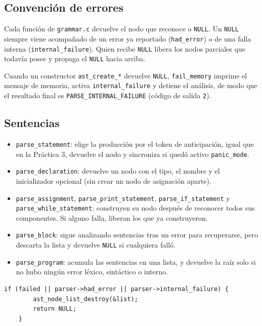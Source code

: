 \documentclass[12pt,letterpaper]{article}
\begin{document}
\subsection*{Convención de errores}

Cada función de \texttt{grammar.c} devuelve el nodo que reconoce o \texttt{NULL}. Un \texttt{NULL} siempre
viene acompañado de un error ya reportado (\texttt{had\_error}) o de una falla interna
(\texttt{internal\_failure}). Quien recibe \texttt{NULL} libera los nodos parciales que todavía posee y
propaga el \texttt{NULL} hacia arriba.

Cuando un constructor \texttt{ast\_create\_*} devuelve \texttt{NULL}, \texttt{fail\_memory} imprime el
mensaje de memoria, activa \texttt{internal\_failure} y detiene el análisis, de modo que el resultado final
es \texttt{PARSE\_INTERNAL\_FAILURE} (código de salida \texttt{2}).

\subsection*{Sentencias}

\begin{itemize}
\item \texttt{parse\_statement}: elige la producción por el token de anticipación, igual que en la Práctica 3,
  devuelve el nodo y sincroniza si quedó activo \texttt{panic\_mode}.
\item \texttt{parse\_declaration}: devuelve un nodo con el tipo, el nombre y el inicializador opcional (sin
  crear un nodo de asignación aparte).
\item \texttt{parse\_assignment}, \texttt{parse\_print\_statement}, \texttt{parse\_if\_statement} y
  \texttt{parse\_while\_statement}: construyen su nodo después de reconocer todos sus componentes. Si alguno
  falla, liberan los que ya construyeron.
\item \texttt{parse\_block}: sigue analizando sentencias tras un error para recuperarse, pero descarta la lista
  y devuelve \texttt{NULL} si cualquiera falló.
\item \texttt{parse\_program}: acumula las sentencias en una lista, y devuelve la raíz solo si no hubo ningún
  error léxico, sintáctico o interno.
\end{itemize}

\begin{lstlisting}[style=modernc, caption={Resultado de \texttt{parse\_program} ante errores.}]
    if (failed || parser->had_error || parser->internal_failure) {
        ast_node_list_destroy(&list);
        return NULL;
    }
\end{lstlisting}
\end{document}
